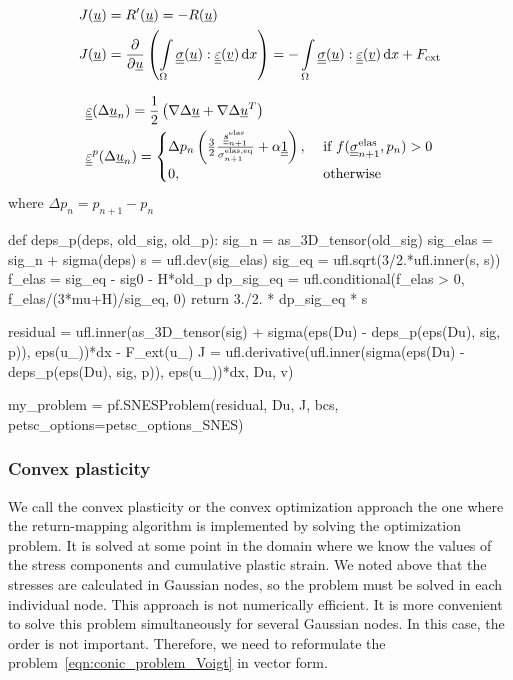 \documentclass[12pt]{article}
\begin{document}
\begin{align}
    & J(\underline{u}) = R^\prime(\underline{u}) = -R(\underline{u}) \\
    & J(\underline{u}) = \frac{\partial}{\partial\underline{u}}\left(\int\limits_\Omega\underline{\underline{\sigma}}(\underline{u}) : \underline{\underline{\varepsilon}}(\underline{v}) \, \mathrm{d} x 
    \right) = -\int\limits_\Omega\underline{\underline{\sigma}}(\underline{u}) : \underline{\underline{\varepsilon}}(\underline{v}) \, \mathrm{d} x + F_\text{ext}
\end{align}

\begin{align}
    & \underline{\underline{\varepsilon}}(\Delta\underline{u}_n) = \frac{1}{2} \left( \nabla\Delta\underline{u} + \nabla\Delta\underline{u}^T \right) \\
    & \underline{\underline{\varepsilon}}^p(\Delta\underline{u}_n) = 
        \begin{cases}
            \Delta p_n \left( \frac{3}{2}\frac{\underline{\underline{s}}_{n+1}^\text{elas}}{\sigma_{n+1}^\text{elas,eq}} + \alpha \underline{\underline{1}} \right), & \text{ if } f(\underline{\underline{\sigma}}_{n+1}^{\text{elas}}, p_n) > 0  \\
            0, & \text{ otherwise}
        \end{cases}
\end{align}
where $\Delta p_n = p_{n+1} - p_n$ 

\begin{pythoncode}
    def deps_p(deps, old_sig, old_p):
        sig_n = as_3D_tensor(old_sig)
        sig_elas = sig_n + sigma(deps)
        s = ufl.dev(sig_elas)
        sig_eq = ufl.sqrt(3/2.*ufl.inner(s, s))
        f_elas = sig_eq - sig0 - H*old_p
        dp_sig_eq = ufl.conditional(f_elas > 0, f_elas/(3*mu+H)/sig_eq, 0) 
        return 3./2. * dp_sig_eq * s 
\end{pythoncode}

\begin{pythoncode}
    residual = ufl.inner(as_3D_tensor(sig) + sigma(eps(Du) - deps_p(eps(Du), sig, p)), eps(u_))*dx - F_ext(u_)
    J = ufl.derivative(ufl.inner(sigma(eps(Du) - deps_p(eps(Du), sig, p)), eps(u_))*dx, Du, v)

    my_problem = pf.SNESProblem(residual, Du, J, bcs, petsc_options=petsc_options_SNES)
\end{pythoncode}
\subsubsection{Convex plasticity}
We call the convex plasticity or the convex optimization approach the one where the return-mapping algorithm is implemented by solving the optimization problem. It is solved at some point in the domain where we know the values of the stress components and cumulative plastic strain. We noted above that the stresses are calculated in Gaussian nodes, so the problem must be solved in each individual node. This approach is not numerically efficient. It is more convenient to solve this problem simultaneously for several Gaussian nodes. In this case, the order is not important. Therefore, we need to reformulate the problem~\ref{eqn:conic_problem_Voigt} in vector form. 
\end{document}
